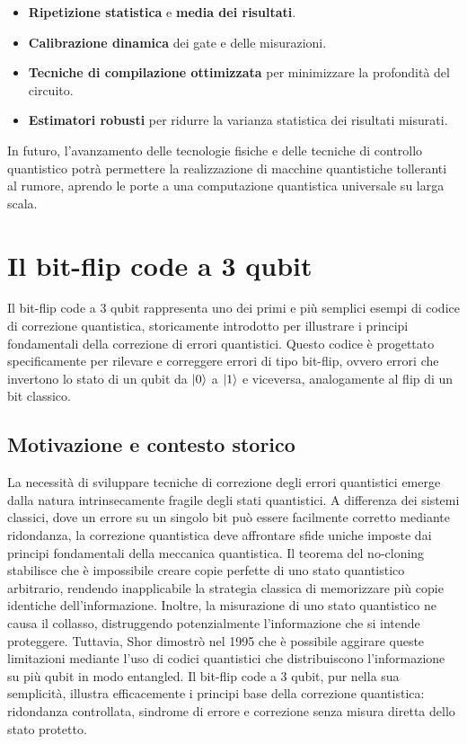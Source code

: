 \documentclass[a4paper,12pt]{report}
\theoremstyle{plain}
\begin{document}
\begin{itemize}
  \item \textbf{Ripetizione statistica} e \textbf{media dei risultati}.
  \item \textbf{Calibrazione dinamica} dei gate e delle misurazioni.
  \item \textbf{Tecniche di compilazione ottimizzata} per minimizzare la profondità del circuito.
  \item \textbf{Estimatori robusti} per ridurre la varianza statistica dei risultati misurati.
\end{itemize}

In futuro, l'avanzamento delle tecnologie fisiche e delle tecniche di controllo quantistico potrà permettere la realizzazione di macchine quantistiche tolleranti al rumore, aprendo le porte a una computazione quantistica universale su larga scala.


\section{Il bit-flip code a 3 qubit}
Il bit-flip code a 3 qubit rappresenta uno dei primi e più semplici esempi di codice di correzione quantistica, storicamente introdotto per illustrare i principi fondamentali della correzione di errori quantistici. Questo codice è progettato specificamente per rilevare e correggere errori di tipo bit-flip, ovvero errori che invertono lo stato di un qubit da $\ket{0}$ a $\ket{1}$ e viceversa, analogamente al flip di un bit classico.
\subsection{Motivazione e contesto storico}
La necessità di sviluppare tecniche di correzione degli errori quantistici emerge dalla natura intrinsecamente fragile degli stati quantistici. A differenza dei sistemi classici, dove un errore su un singolo bit può essere facilmente corretto mediante ridondanza, la correzione quantistica deve affrontare sfide uniche imposte dai principi fondamentali della meccanica quantistica.
Il teorema del no-cloning stabilisce che è impossibile creare copie perfette di uno stato quantistico arbitrario, rendendo inapplicabile la strategia classica di memorizzare più copie identiche dell'informazione. Inoltre, la misurazione di uno stato quantistico ne causa il collasso, distruggendo potenzialmente l'informazione che si intende proteggere. Tuttavia, Shor dimostrò nel 1995 che è possibile aggirare queste limitazioni mediante l'uso di codici quantistici che distribuiscono l'informazione su più qubit in modo entangled.
Il bit-flip code a 3 qubit, pur nella sua semplicità, illustra efficacemente i principi base della correzione quantistica: ridondanza controllata, sindrome di errore e correzione senza misura diretta dello stato protetto.
\end{document}
